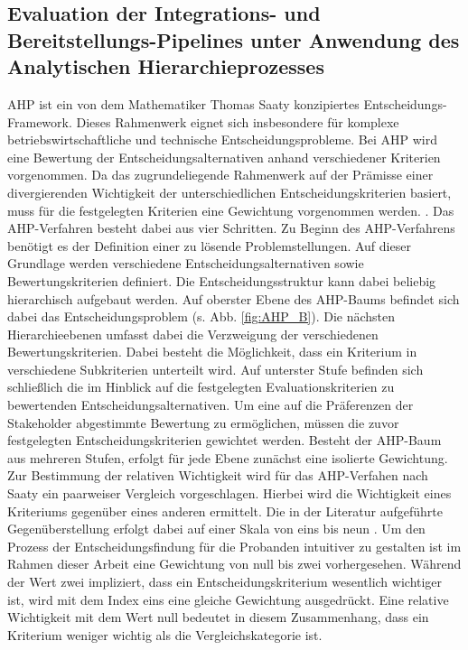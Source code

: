 \subsection{Evaluation der Integrations- und Bereitstellungs-Pipelines unter Anwendung des Analytischen Hierarchieprozesses}
AHP ist ein von dem Mathematiker Thomas Saaty konzipiertes Entscheidungs-Framework. Dieses Rahmenwerk eignet sich insbesondere für komplexe betriebswirtschaftliche und technische Entscheidungsprobleme. Bei AHP wird eine Bewertung der Entscheidungsalternativen anhand verschiedener Kriterien vorgenommen.  Da das zugrundeliegende Rahmenwerk auf der Prämisse einer divergierenden Wichtigkeit der unterschiedlichen Entscheidungskriterien basiert, muss für die festgelegten Kriterien eine Gewichtung vorgenommen werden. \cite[86]{Saaty.2008}.  Das AHP-Verfahren besteht dabei aus vier Schritten. Zu Beginn des AHP-Verfahrens benötigt es der Definition einer zu lösende Problemstellungen. Auf dieser Grundlage werden verschiedene Entscheidungsalternativen sowie Bewertungskriterien definiert. Die Entscheidungsstruktur kann dabei beliebig hierarchisch aufgebaut werden. Auf oberster Ebene des AHP-Baums befindet sich dabei das Entscheidungsproblem (s. Abb. \ref*{fig:AHP_B}). Die nächsten Hierarchieebenen umfasst dabei die Verzweigung der verschiedenen Bewertungskriterien. Dabei besteht die Möglichkeit, dass ein Kriterium in verschiedene Subkriterien unterteilt wird. Auf unterster Stufe befinden sich schließlich die im Hinblick auf die festgelegten Evaluationskriterien zu bewertenden Entscheidungsalternativen. Um eine auf die Präferenzen der Stakeholder abgestimmte Bewertung zu ermöglichen, müssen die zuvor festgelegten Entscheidungskriterien gewichtet werden. Besteht der AHP-Baum aus mehreren Stufen, erfolgt für jede Ebene zunächst eine isolierte Gewichtung. Zur Bestimmung der relativen Wichtigkeit wird für das AHP-Verfahen nach Saaty ein paarweiser Vergleich vorgeschlagen. Hierbei wird die Wichtigkeit eines Kriteriums gegenüber eines anderen ermittelt. Die in der Literatur aufgeführte Gegenüberstellung erfolgt dabei auf einer Skala von eins bis neun \cite[86]{Saaty.2008}. Um den Prozess der Entscheidungsfindung für die Probanden intuitiver zu gestalten ist im Rahmen dieser Arbeit eine Gewichtung von null bis zwei vorhergesehen. Während der Wert zwei impliziert, dass ein Entscheidungskriterium wesentlich wichtiger ist, wird mit dem Index eins eine gleiche Gewichtung ausgedrückt. Eine relative Wichtigkeit mit dem Wert null bedeutet in diesem Zusammenhang, dass ein Kriterium weniger wichtig als die Vergleichskategorie ist.  

